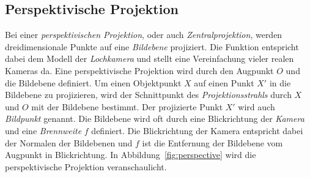 \documentclass[ngerman,a4paper,parskip=half]{scrartcl}
\begin{document}
\subsection{Perspektivische Projektion}
\label{sec:perspective}

Bei einer \emph{perspektivischen Projektion}, oder auch \emph{Zentralprojektion}, werden dreidimensionale Punkte auf eine \emph{Bildebene} projiziert. Die Funktion entspricht dabei dem Modell der \emph{Lochkamera} und stellt eine Vereinfachung vieler realen Kameras da. Eine perspektivische Projektion wird durch den Augpunkt $O$ und die Bildebene definiert. Um einen Objektpunkt $X$ auf einen Punkt $X'$ in die Bildebene zu projizieren, wird der Schnittpunkt des \emph{Projektionsstrahls} durch $X$ und $O$ mit der Bildebene bestimmt. Der projizierte Punkt $X'$ wird auch \emph{Bildpunkt} genannt. Die Bildebene wird oft durch eine Blickrichtung der \emph{Kamera} und eine \emph{Brennweite} $f$ definiert. Die Blickrichtung der Kamera entspricht dabei der Normalen der Bildebenen und $f$ ist die Entfernung der Bildebene vom Augpunkt in Blickrichtung. In Abbildung~\ref{fig:perspective} wird die perspektivische Projektion veranschaulicht.
\end{document}
